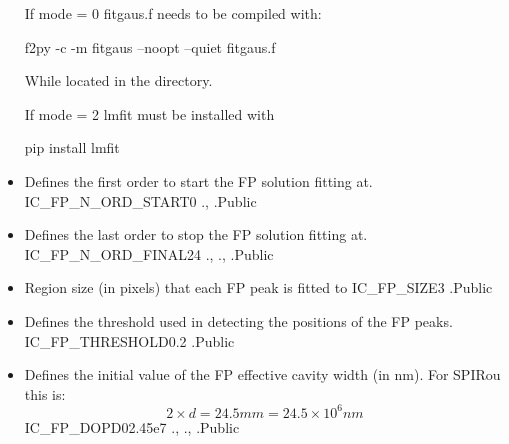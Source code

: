 \begin{itemize}
\begin{minipage}[t]{\textwidth}
\ifdevguide
\begin{note}
If mode = 0 fitgaus.f needs to be compiled with:
\begin{cmdbox}
f2py -c -m fitgaus --noopt --quiet fitgaus.f
\end{cmdbox}
While located in the  directory.
\end{note}

\begin{note}
If mode = 2 lmfit must be installed with
\begin{cmdbox}
pip install lmfit
\end{cmdbox}
\end{note}
\fi
\end{minipage}


\item {} 
{Defines the first order to start the FP solution fitting at.}
{IC\_FP\_N\_ORD\_START}{0}
{\calWAVE}{\constantsfile}{\spirouWAVE., \spirouWAVE.}{Public}

\item {} 
{Defines the last order to stop the FP solution fitting at.}
{IC\_FP\_N\_ORD\_FINAL}{24}
{\calWAVE}{\constantsfile}{\spirouWAVE., \spirouWAVE., \spirouPlot.}{Public}

\item {} 
{Region size (in pixels) that each FP peak is fitted to}
{IC\_FP\_SIZE}{3}
{\calWAVE}{\constantsfile}{\spirouWAVE.}{Public}

\item {} 
{Defines the threshold used in detecting the positions of the FP peaks.}
{IC\_FP\_THRESHOLD}{0.2}
{\calWAVE}{\constantsfile}{\spirouWAVE.}{Public}

\item {} 
{Defines the initial value of the FP effective cavity width (in nm). For SPIRou this is: 
\begin{equation}
2 \times d = 24.5 mm = 24.5\times10^{6} nm
\end{equation}
}
{IC\_FP\_DOPD0}{2.45e7}
{\calWAVE}{\constantsfile}{\spirouWAVE., \spirouWAVE., \spirouWAVE.}{Public}


\end{itemize}
